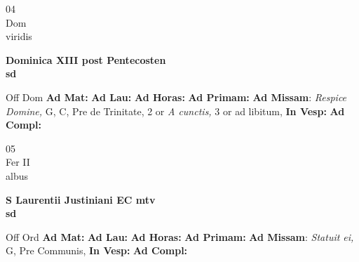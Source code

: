 \documentclass[10pt, openany]{book}
\begin{document}
    \begin{center}
        \begin{minipage}{3.5in}
            \vspace{2em}
            \begin{minipage}{0.5in}
                {\Huge 04} \\
                {\normalsize Dom} \\
                {\normalsize viridis}
            \end{minipage}
            \begin{minipage}{3.0in}
                \textbf{ \large Dominica XIII post Pentecosten \\
                \textnormal{\normalsize sd}} \\ 
            \end{minipage}
            \begin{justify}Off Dom
                \textbf{Ad Mat: }
                \textbf{Ad Lau: }
                \textbf{Ad Horas: }
                \textbf{Ad Primam: }\textbf{Ad Missam}: \textit{Respice Domine,} G, C, Pre de Trinitate, 2 or \textit{A cunctis,} 3 or ad libitum,  
                \textbf{In Vesp: }
                \textbf{Ad Compl: }
            \end{justify}
        \end{minipage}
    \end{center}

    \begin{center}
        \begin{minipage}{3.5in}
            \vspace{2em}
            \begin{minipage}{0.5in}
                {\Huge 05} \\
                {\normalsize Fer II} \\
                {\normalsize albus}
            \end{minipage}
            \begin{minipage}{3.0in}
                \textbf{ \large S Laurentii Justiniani EC mtv \\
                \textnormal{\normalsize sd}} \\ 
            \end{minipage}
            \begin{justify}Off Ord
                \textbf{Ad Mat: }
                \textbf{Ad Lau: }
                \textbf{Ad Horas: }
                \textbf{Ad Primam: }\textbf{Ad Missam}: \textit{Statuit ei,} G, Pre Communis,  
                \textbf{In Vesp: }
                \textbf{Ad Compl: }
            \end{justify}
        \end{minipage}
    \end{center}
\end{document}
